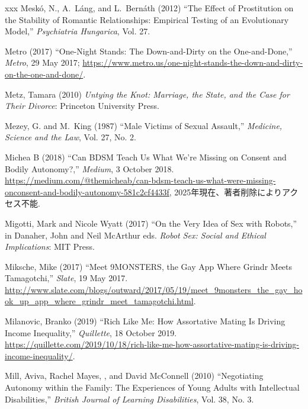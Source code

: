 \documentclass[]{jlreq} \usepackage{mystyle}
\begin{document}
\begin{thebibliography}{xxx}
Meskó, N., A.~Láng, and L.~Bernáth (2012) ``The Effect of Prostitution on
  the Stability of Romantic Relationships: Empirical Testing of an Evolutionary
  Model,'' \textit{ Psychiatria Hungarica}, Vol. 27.

Metro (2017) ``One-Night Stands: The Down-and-Dirty on the One-and-Done,''
  \emph{Metro}, 29 May 2017;
  \url{https://www.metro.us/one-night-stands-the-down-and-dirty-on-the-one-and-done/}.

Metz, Tamara (2010)  \textit{ Untying the Knot: Marriage, the State, and the
  Case for Their Divorce}: Princeton University Press.

Mezey, G. and M.~King (1987) ``Male Victims of Sexual Assault,'' \textit{
  Medicine, Science and the Law}, Vol. 27, No. 2.

{Michea B} (2018) ``Can BDSM Teach Us What We're Missing on Consent and Bodily
  Autonomy?,'' \emph{Medium}, 3 October 2018.
  \url{https://medium.com/@themicheab/can-bdsm-teach-us-what-were-missing-onconsent-and-bodily-autonomy-581c2cf4433f},
  2025年現在、著者削除によりアクセス不能.

Migotti, Mark and Nicole Wyatt (2017) ``On the Very Idea of Sex with Robots,''
  in Danaher, John and Neil McArthur eds.   \textit{ Robot Sex: Social and
  Ethical Implications}: MIT Press.

Miksche, Mike (2017) ``Meet 9MONSTERS, the Gay App Where Grindr Meets
  Tamagotchi,'' \emph{Slate}, 19 May 2017.
  \url{http://www.slate.com/blogs/outward/2017/05/19/meet_9monsters_the_gay_hook_up_app_where_grindr_meet_tamagotchi.html}.

Milanovic, Branko (2019) ``Rich Like Me: How Assortative Mating Is Driving
  Income Inequality,'' \emph{Quillette}, 18 October 2019.
  \url{https://quillette.com/2019/10/18/rich-like-me-how-assortative-mating-is-driving-income-inequality/}.

Mill, Aviva, Rachel Mayes, , and David McConnell (2010) ``Negotiating Autonomy
  within the Family: The Experiences of Young Adults with Intellectual
  Disabilities,'' \textit{ British Journal of Learning Disabilities}, Vol. 38,
  No. 3.


\end{thebibliography}
\end{document}
